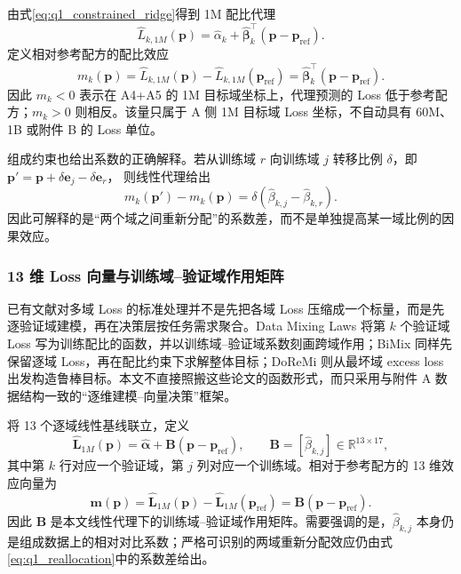 由式\eqref{eq:q1_constrained_ridge}得到 1M 配比代理
\begin{equation}
\widehat L_{k,1M}(\boldsymbol p)
=
\widehat\alpha_k
+
\widehat{\boldsymbol\beta}_k^\top
(\boldsymbol p-\boldsymbol p_{\mathrm{ref}}).
\label{eq:q1_1m_surrogate}
\end{equation}
定义相对参考配方的配比效应
\begin{equation}
m_k(\boldsymbol p)
=
\widehat L_{k,1M}(\boldsymbol p)
-
\widehat L_{k,1M}(\boldsymbol p_{\mathrm{ref}})
=
\widehat{\boldsymbol\beta}_k^\top
(\boldsymbol p-\boldsymbol p_{\mathrm{ref}}).
\label{eq:q1_centered_effect}
\end{equation}
因此 $m_k<0$ 表示在 A4+A5 的 1M 目标域坐标上，代理预测的 Loss 低于参考配方；$m_k>0$ 则相反。该量只属于 A 侧 1M 目标域 Loss 坐标，不自动具有 60M、1B 或附件 B 的 Loss 单位。

组成约束也给出系数的正确解释。若从训练域 $r$ 向训练域 $j$ 转移比例 $\delta$，即
$\boldsymbol p'=\boldsymbol p+\delta\boldsymbol e_j-\delta\boldsymbol e_r$，
则线性代理给出
\begin{equation}
m_k(\boldsymbol p')-m_k(\boldsymbol p)
=
\delta(\widehat\beta_{k,j}-\widehat\beta_{k,r}).
\label{eq:q1_reallocation}
\end{equation}
因此可解释的是“两个域之间重新分配”的系数差，而不是单独提高某一域比例的因果效应。

\subsubsection{13 维 Loss 向量与训练域--验证域作用矩阵}

已有文献对多域 Loss 的标准处理并不是先把各域 Loss 压缩成一个标量，而是先逐验证域建模，再在决策层按任务需求聚合。Data Mixing Laws 将第 $k$ 个验证域 Loss 写为训练配比的函数，并以训练域--验证域系数刻画跨域作用；BiMix 同样先保留逐域 Loss，再在配比约束下求解整体目标；DoReMi 则从最坏域 excess loss 出发构造鲁棒目标\cite{datamixinglaws2025,bimix2025,doremi2023}。本文不直接照搬这些论文的函数形式，而只采用与附件 A 数据结构一致的“逐维建模--向量决策”框架。

将 13 个逐域线性基线联立，定义
\begin{equation}
\widehat{\boldsymbol L}_{1M}(\boldsymbol p)
=
\widehat{\boldsymbol\alpha}
+
\boldsymbol B
(\boldsymbol p-\boldsymbol p_{\mathrm{ref}}),
\qquad
\boldsymbol B=
[\widehat\beta_{k,j}]
\in\mathbb R^{13\times17},
\label{eq:q1_vector_loss}
\end{equation}
其中第 $k$ 行对应一个验证域，第 $j$ 列对应一个训练域。相对于参考配方的 13 维效应向量为
\begin{equation}
\boldsymbol m(\boldsymbol p)
=
\widehat{\boldsymbol L}_{1M}(\boldsymbol p)
-
\widehat{\boldsymbol L}_{1M}(\boldsymbol p_{\mathrm{ref}})
=
\boldsymbol B
(\boldsymbol p-\boldsymbol p_{\mathrm{ref}}).
\label{eq:q1_vector_effect}
\end{equation}
因此 $\boldsymbol B$ 是本文线性代理下的训练域--验证域作用矩阵。需要强调的是，$\widehat\beta_{k,j}$ 本身仍是组成数据上的相对对比系数；严格可识别的两域重新分配效应仍由式\eqref{eq:q1_reallocation}中的系数差给出。

